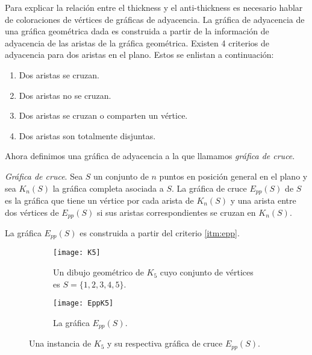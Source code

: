
Para explicar la relación entre el thickness y el anti-thickness es necesario hablar
de coloraciones de vértices de gráficas de adyacencia. La gráfica de adyacencia de una gráfica geométrica dada
es construida a partir de la información de adyacencia de las aristas de la gráfica geométrica.
Existen 4 criterios de adyacencia para dos aristas en el plano. Estos se enlistan a continuación:
\begin{enumerate}
  \item \label{itm:epp} Dos aristas se cruzan.
  \item \label{itm:W} Dos aristas no se cruzan.
  \item \label{itm:I} Dos aristas se cruzan o comparten un vértice.
  \item \label{itm:D} Dos aristas son totalmente disjuntas.
\end{enumerate}
Ahora definimos una gráfica de adyacencia a la que llamamos \emph{gráfica de cruce}.

\begin{definition}{\emph{Gráfica de cruce}.}
  Sea $S$ un conjunto de $n$ puntos en posición general en el plano y sea $K_n(S)$ la gráfica completa
  asociada a $S$. La gráfica de cruce $E_{pp}(S)$ de $S$ es la gráfica que tiene un vértice
  por cada arista de $K_n(S)$ y una arista entre dos vértices de $E_{pp}(S)$ si sus aristas correspondientes
  se cruzan en $K_n(S)$.
\end{definition}

La gráfica $E_{pp}(S)$ es construida a partir del criterio \ref{itm:epp}.
\begin{figure}
\begin{subfigure}{.5\textwidth}
  \centering
  \texttt{[image: K5]}
  \caption{Un dibujo geométrico de $K_5$ cuyo conjunto de vértices es $S=\{1,2,3,4,5\}$.}
  \label{fig:k5}
\end{subfigure}%
\begin{subfigure}{.5\textwidth}
  \centering
  \texttt{[image: EppK5]}
  \caption{La gráfica $E_{pp}(S)$.}
  \label{fig:eppk5}
\end{subfigure}
\caption{Una instancia de $K_5$ y su respectiva gráfica de cruce $E_{pp}(S)$.}
\label{fig:ejemploeppk5}
\end{figure}

